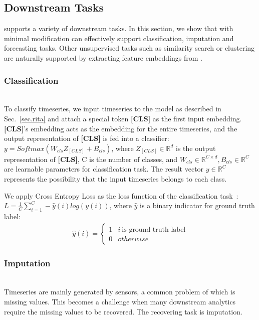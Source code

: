 \begin{sloppypar}
\subsection{Downstream Tasks}
\label{appendix.downstream}
\system supports a variety of downstream tasks. In this section, we show that with minimal modification \system can effectively support classification, imputation and forecasting tasks. 
Other unsupervised tasks such as similarity search or clustering are naturally supported by extracting feature embeddings from \system.

\subsubsection{\textbf{Classification}\nopunct}\ \\
To classify timeseries, we input timeseries to the model as described in Sec.~\ref{sec.rita} and attach a special token \textbf{[CLS]} as the first input embedding. \textbf{[CLS]}'s embedding acts as the embedding for the entire timeseries, and the output representation of \textbf{[CLS]} is fed into a classifier: $\mathit{y=Softmax(W_{cls}Z_{[CLS]}+B_{cls})}$, where $Z_{[CLS]}\in \mathbb{R}^d$ is the output representation of \textbf{[CLS]}, C is the number of classes, and $\mathit{W_{cls} \in \mathbb{R}^{C \times d}, B_{cls} \in \mathbb{R}^{C}}$ are learnable parameters for classification task. 
The result vector $y\in \mathbb{R}^{C}$ represents the possibility that the input timeseries belongs to each class.

We apply Cross Entropy Loss as the loss function of the classification task~\cite{cox1958regression}:
$\mathit{L=\frac{1}{C}\sum_{i=1}^C -\hat{y}(i)log(y(i))}$, where $\hat{y}$ is a binary indicator for ground truth label:
\vspace{-0.5mm}
\begin{eqnarray}
\hat{y}(i) =
\begin{cases}
1   & i\  \text{is ground truth label} \\
0   & otherwise
\end{cases}
\end{eqnarray}

\subsubsection{\textbf{Imputation}\nopunct}\ \\
\label{sec.transformer.imputation}
Timeseries are mainly generated by sensors, a common problem of which is missing values. This becomes a challenge when many downstream analytics require the missing values to be recovered. The recovering task is imputation. 


\end{sloppypar}
